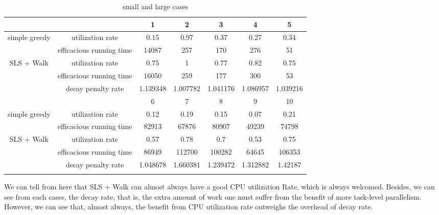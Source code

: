 \documentclass{article}
\begin{document}
\begin{table}[H]
\begin{tabular}{ccccccc}
\hline
                        &                 & 1        & 2        & 3        & 4        & 5        \\ \hline
\multirow{2}{*}{simple   greedy} & utilization rate         & 0.15     & 0.97     & 0.37     & 0.27     & 0.34     \\
                                 & efficacious running time & 14087    & 257      & 170      & 276      & 51       \\ \hline
\multirow{3}{*}{SLS   + Walk}    & utilization rate         & 0.75     & 1        & 0.77     & 0.82     & 0.75     \\
                                 & efficacious running time & 16050    & 259      & 177      & 300      & 53       \\
                                 & decay penalty rate       & 1.139348 & 1.007782 & 1.041176 & 1.086957 & 1.039216 \\ \hline
\multicolumn{1}{l}{}             & \multicolumn{1}{l}{}     & 6        & 7        & 8        & 9        & 10       \\ \hline
\multirow{2}{*}{simple   greedy} & utilization rate         & 0.12     & 0.19     & 0.15     & 0.07     & 0.21     \\
                                 & efficacious running time & 82913    & 67876    & 80907    & 49239    & 74798    \\ \hline
\multirow{3}{*}{SLS   + Walk}    & utilization rate         & 0.57     & 0.78     & 0.7      & 0.53     & 0.75     \\
                                 & efficacious running time & 86949    & 112700   & 100282   & 64645    & 106353   \\
                                 & decay penalty rate       & 1.048678 & 1.660381 & 1.239472 & 1.312882 & 1.42187  \\ \hline
                                 \label{LargeCases}
\end{tabular}
\caption{small and large cases}
        
\end{table}
    
    We can tell from here that SLS + Walk can almost always have a good CPU utilization Rate, which is always welcomed. Besides, we can see from each cases, the decay rate, that is, the extra amount of work one must suffer from the benefit of more task-level parallelism. However, we can see that, almost always, the benefit from CPU utilization rate outweighs the overhead of decay rate.
    
\end{document}
